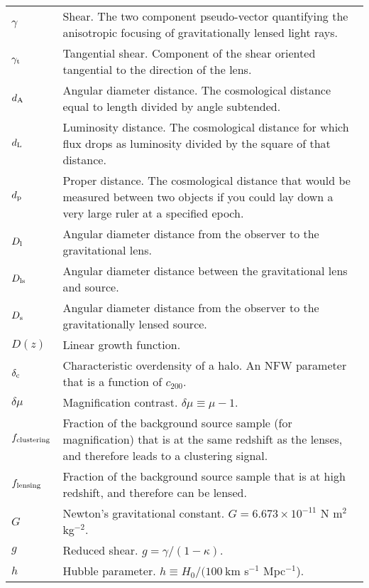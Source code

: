 \section*{\underline{}}
\vspace{-0.5cm}
\begin{tabular}{p{0.6in}p{5.8in}}

$\gamma$ & Shear. The two component pseudo-vector quantifying the anisotropic focusing of gravitationally lensed light rays. \\
$\gamma_{\rm t}$ & Tangential shear. Component of the shear oriented tangential to the direction of the lens. \\
$d_{\rm A}$ & Angular diameter distance. The cosmological distance equal to length divided by angle subtended. \\
$d_{\rm L}$ & Luminosity distance. The cosmological distance for which flux drops as luminosity divided by the square of that distance. \\
$d_{\rm p}$ & Proper distance. The cosmological distance that would be measured between two objects if you could lay down a very large ruler at a specified epoch. \\
$D_{\rm l}$ & Angular diameter distance from the observer to the gravitational lens. \\
$D_{\rm ls}$ & Angular diameter distance between the gravitational lens and source. \\
$D_{\rm s}$ & Angular diameter distance from the observer to the gravitationally lensed source. \\
$D(z)$ & Linear growth function. \\
$\delta_{\rm c}$ & Characteristic overdensity of a halo. An \acs{NFW} parameter that is a function of $c_{200}$. \\
$\delta\mu$ & Magnification contrast. $\delta\mu \equiv \mu -1$. \\
$f_{\rm clustering}$ & Fraction of the background source sample (for magnification) that is at the same redshift as the lenses, and therefore leads to a clustering signal. \\
$f_{\rm lensing}$ & Fraction of the background source sample that is at high redshift, and therefore can be lensed. \\
$G$ & Newton's gravitational constant. $G = 6.673 \times 10^{-11}$ N m$^2$ kg$^{-2}$.\\
$g$ & Reduced shear. $g = \gamma/(1-\kappa)$. \\
$h$ & Hubble parameter. $h \equiv H_0/(100\ $km s$^{-1}$ Mpc$^{-1}$). \\

\end{tabular}
